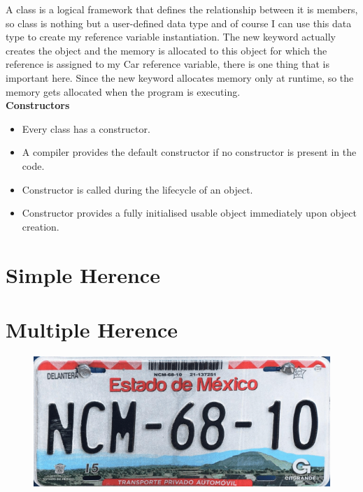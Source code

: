 \documentclass[
	12pt, %
]{fphw}
\begin{document}
A class is a logical framework that defines the relationship between it is members, so class is nothing but a user-defined data type and of course I can use this data type to create my reference variable instantiation. The new keyword actually creates the object and the memory is allocated to this object for which the reference is assigned to my Car reference variable, there is one thing that is important here. Since the new keyword allocates memory only at runtime, so the memory gets allocated when the program is executing.\\

\textbf{Constructors} \\

\begin{itemize}
\item Every class has a constructor.
\item A compiler provides the default constructor if no constructor is present in the code.
\item Constructor is called during the lifecycle of an object.
\item Constructor provides a fully initialised usable object immediately upon object creation.
  
\end{itemize}


\section*{{\color{Cerulean}Simple Herence}}



\section*{{\color{RoyalPurple}Multiple Herence}}

\begin{figure}[H]
  \centering
  \includegraphics[scale=0.4]{images/placa_auto.png}
\end{figure}
\end{document}
